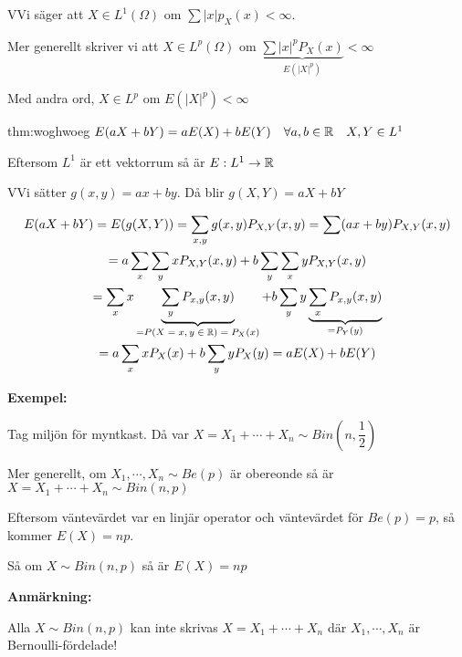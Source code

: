 \par\bigskip
\begin{theo}
  VVi säger att $X\in L^1(\Omega)$ om $\sum\left|x\right|p_X(x)<\infty$.\par
  \noindent Mer generellt skriver vi att $X\in L^p(\Omega)$ om $\underbrace{\sum\left|x\right|^pP_X(x)}_{\text{$E(\left|X\right|^p)$}}<\infty$\par
  \noindent Med andra ord, $X\in L^p$ om $E(\left|X\right|^p)<\infty$
\end{theo}
\par\bigskip
\begin{theo}{thm:woghwoeg}
  $E(aX+bY) = aE(X)+bE(Y)\quad\forall a,b\in\mathbb{R}\quad X,Y\in L^1$
  \par\bigskip
  \noindent Eftersom $L^1$ är ett vektorrum så är $E:L^1\to\mathbb{R}$
\end{theo}
\newpage
\begin{prf}
  VVi sätter $g(x,y) = ax+by$. Då blir $g(X,Y) = aX+bY$\par
  \begin{equation*}
    \begin{gathered}
      E(aX+bY) = E(g(X,Y)) = \sum_{x,y} g(x,y)P_{X,Y}(x,y) = \sum (ax+by)P_{X,Y}(x,y)\\
      = a\sum_x\sum_y xP_{X,Y}(x,y)+b\sum_y\sum_x yP_{X,Y}(x,y)\\
      = \sum_x x\underbrace{\sum_y P_{x,y}(x,y)}_{\text{=$P(X=x,y\in\mathbb{R})=P_X(x)$}}+b\sum_y y\underbrace{\sum_x P_{x,y}(x,y)}_{\text{=$P_Y(y)$}}\\
      = a\sum_x xP_X(x)+b\sum_y yP_X(y) = aE(X)+bE(Y)
    \end{gathered}
  \end{equation*}
\end{prf}
\par\bigskip
\noindent\textbf{Exempel:}\par
\noindent Tag miljön för myntkast. Då var $X = X_1+\cdots+X_n\sim Bin(n,\dfrac{1}{2})$
\par\bigskip
\noindent Mer generellt, om $X_1,\cdots, X_n\sim Be(p)$ är obereonde så är $X=X_1+\cdots+X_n\sim Bin(n,p)$\par
\noindent Eftersom väntevärdet var en linjär operator och väntevärdet för $Be(p)=p$, så kommer $E(X) = np$.
\par\bigskip
\noindent Så om $X\sim Bin(n,p)$ så är $E(X)=np$
\par\bigskip
\noindent\textbf{Anmärkning:}\par
\noindent Alla $X\sim Bin(n,p)$ kan inte skrivas $X=X_1+\cdots+X_n$ där $X_1,\cdots,X_n$ är Bernoulli-fördelade!
